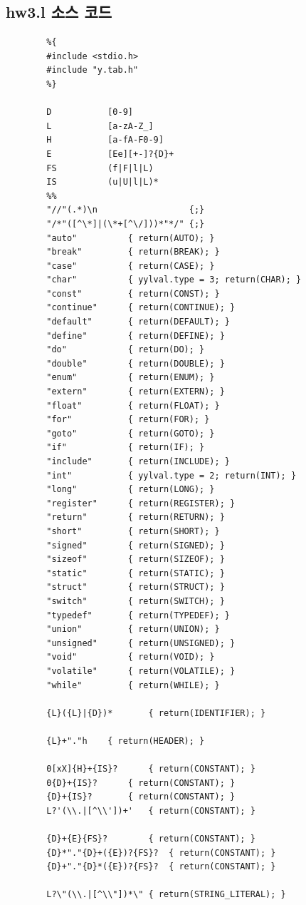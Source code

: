 \documentclass{article}
\begin{document}
\subsection{hw3.l 소스 코드}
\begin{lstlisting}
		%{
		#include <stdio.h>
		#include "y.tab.h"
		%}
		
		D			[0-9]
		L			[a-zA-Z_]
		H			[a-fA-F0-9]
		E			[Ee][+-]?{D}+
		FS			(f|F|l|L)
		IS			(u|U|l|L)*
		%%
		"//"(.*)\n 					{;}
		"/*"([^\*]|(\*+[^\/]))*"*/" {;}
		"auto"			{ return(AUTO); }
		"break"			{ return(BREAK); }
		"case"			{ return(CASE); }
		"char"			{ yylval.type = 3; return(CHAR); }
		"const"			{ return(CONST); }
		"continue"		{ return(CONTINUE); }
		"default"		{ return(DEFAULT); }
		"define"		{ return(DEFINE); }
		"do"			{ return(DO); }
		"double"		{ return(DOUBLE); }
		"enum"			{ return(ENUM); }
		"extern"		{ return(EXTERN); }
		"float"			{ return(FLOAT); }
		"for"			{ return(FOR); }
		"goto"			{ return(GOTO); }
		"if"			{ return(IF); }
		"include"		{ return(INCLUDE); }
		"int"			{ yylval.type = 2; return(INT); }
		"long"			{ return(LONG); }
		"register"		{ return(REGISTER); }
		"return"		{ return(RETURN); }
		"short"			{ return(SHORT); }
		"signed"		{ return(SIGNED); }
		"sizeof"		{ return(SIZEOF); }
		"static"		{ return(STATIC); }
		"struct"		{ return(STRUCT); }
		"switch"		{ return(SWITCH); }
		"typedef"		{ return(TYPEDEF); }
		"union"			{ return(UNION); }
		"unsigned"		{ return(UNSIGNED); }
		"void"			{ return(VOID); }
		"volatile"		{ return(VOLATILE); }
		"while"			{ return(WHILE); }
		
		{L}({L}|{D})*		{ return(IDENTIFIER); }
		
		{L}+"."h	{ return(HEADER); }
		
		0[xX]{H}+{IS}?		{ return(CONSTANT); }
		0{D}+{IS}?		{ return(CONSTANT); }
		{D}+{IS}?		{ return(CONSTANT); }
		L?'(\\.|[^\\'])+'	{ return(CONSTANT); }
		
		{D}+{E}{FS}?		{ return(CONSTANT); }
		{D}*"."{D}+({E})?{FS}?	{ return(CONSTANT); }
		{D}+"."{D}*({E})?{FS}?	{ return(CONSTANT); }
		
		L?\"(\\.|[^\\"])*\"	{ return(STRING_LITERAL); }
		

\end{lstlisting}
\end{document}
